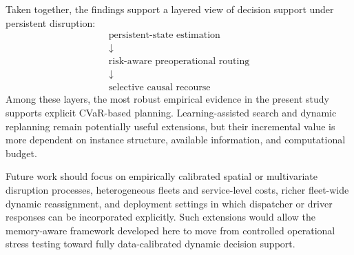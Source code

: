 \documentclass[preprint,12pt]{elsarticle}
\newcommand{\1}{\mathbf{1}}
\begin{document}
Taken together, the findings support a layered view of decision support under
persistent disruption:
\[
\boxed{\begin{gathered}
\text{persistent-state estimation}\\[-1pt]
\downarrow\\[-1pt]
\text{risk-aware preoperational routing}\\[-1pt]
\downarrow\\[-1pt]
\text{selective causal recourse}
\end{gathered}}
\]
Among these layers, the most robust empirical evidence in the present study
supports explicit CVaR-based planning. Learning-assisted search and dynamic
replanning remain potentially useful extensions, but their incremental value is
more dependent on instance structure, available information, and computational
budget.

Future work should focus on empirically calibrated spatial or multivariate
disruption processes, heterogeneous fleets and service-level costs, richer
fleet-wide dynamic reassignment, and deployment settings in which dispatcher or
driver responses can be incorporated explicitly. Such extensions would allow
the memory-aware framework developed here to move from controlled operational
stress testing toward fully data-calibrated dynamic decision support.















 

\end{document}

